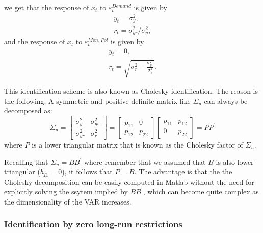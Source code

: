 \documentclass[10pt]{article}
\begin{document}
we get that the response of $x_{t}$ to $\varepsilon _{t}^{Demand}$ is given
by%
\begin{equation*}
\begin{array}{c}
y_{t}=\sigma _{y}^{2}, \\
r_{t}=\sigma _{yr}^{2}/\sigma _{y}^{2},%
\end{array}%
\end{equation*}%
and the response of $x_{t}$ to $\varepsilon _{t}^{Mon.\ Pol}$ is given by
\begin{equation*}
\begin{array}{c}
y_{t}=0, \\
r_{t}=\sqrt{\sigma _{r}^{2}-\frac{\sigma _{yr}^{2}}{\sigma _{y}^{2}}}.%
\end{array}%
\end{equation*}

This identification scheme is also known as Cholesky identification. The
reason is the following. A symmetric and positive-definite matrix like $%
\Sigma _{u}$ can always be decomposed as:%
\begin{equation*}
\Sigma _{u}=\left[
\begin{array}{cc}
\sigma _{y}^{2} & \sigma _{yr}^{2} \\
\sigma _{yr}^{2} & \sigma _{r}^{2}%
\end{array}%
\right] =\left[
\begin{array}{cc}
p_{11} & 0 \\
p_{12} & p_{22}%
\end{array}%
\right] \left[
\begin{array}{cc}
p_{11} & p_{12} \\
0 & p_{22}%
\end{array}%
\right] =PP^{\prime }
\end{equation*}%
where $P$ is a lower triangular matrix that is known as the Cholesky factor
of $\Sigma _{u}$.

Recalling that $\Sigma _{u}=BB^{\prime }$ where remember that we assumed
that $B$ is also lower triangular ($b_{21}=0$), it follows that $P=B$. The
advantage is that the the Cholesky decomposition can be easily computed in
Matlab without the need for explicitly solving the ssytem implied by $%
BB^{\prime }$, which can become quite complex as the dimensionality of the
VAR increases.

\subsubsection{Identification by zero long-run restrictions}
\end{document}

